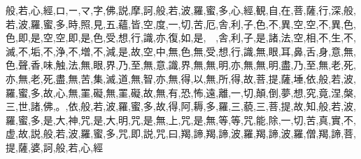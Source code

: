 般,若,心,經,ロ,ー,マ,字,佛,説,摩,訶,般,若,波,羅,蜜,多,心,經,観,自,在,菩,薩,行,深,般,若,波,羅,蜜,多,時,照,見,五,蘊,皆,空,度,一,切,苦,厄,舎,利,子,色,不,異,空,空,不,異,色,色,即,是,空,空,即,是,色,受,想,行,識,亦,復,如,是,　,舎,利,子,是,諸,法,空,相,不,生,不,滅,不,垢,不,浄,不,増,不,減,是,故,空,中,無,色,無,受,想,行,識,無,眼,耳,鼻,舌,身,意,無,色,聲,香,味,触,法,無,眼,界,乃,至,無,意,識,界,無,無,明,亦,無,無,明,盡,乃,至,無,老,死,亦,無,老,死,盡,無,苦,集,滅,道,無,智,亦,無,得,以,無,所,得,故,菩,提,薩,埵,依,般,若,波,羅,蜜,多,故,心,無,罣,礙,無,罣,礙,故,無,有,恐,怖,遠,離,一,切,顛,倒,夢,想,究,竟,涅,槃,三,世,諸,佛,。,依,般,若,波,羅,蜜,多,故,得,阿,耨,多,羅,三,藐,三,菩,提,故,知,般,若,波,羅,蜜,多,是,大,神,咒,是,大,明,咒,是,無,上,咒,是,無,等,等,咒,能,除,一,切,苦,真,實,不,虚,故,説,般,若,波,羅,蜜,多,咒,即,説,咒,曰,羯,諦,羯,諦,波,羅,羯,諦,波,羅,僧,羯,諦,菩,提,薩,婆,訶,般,若,心,經

\endinput